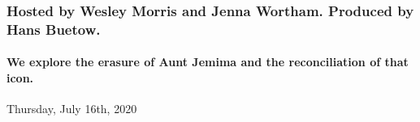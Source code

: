 \hypertarget{hosted-by-wesley-morris-and-jenna-wortham-produced-by-hans-buetow-1}{%
\subsubsection{Hosted by Wesley Morris and Jenna Wortham. Produced by
Hans
Buetow.}\label{hosted-by-wesley-morris-and-jenna-wortham-produced-by-hans-buetow-1}}

\hypertarget{we-explore-the-erasure-of-aunt-jemima-and-the-reconciliation-of-that-icon-2}{%
\paragraph{We explore the erasure of Aunt Jemima and the reconciliation
of that
icon.}\label{we-explore-the-erasure-of-aunt-jemima-and-the-reconciliation-of-that-icon-2}}

Thursday, July 16th, 2020

